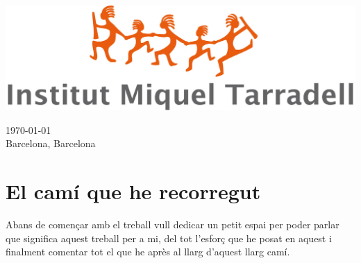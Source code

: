 \documentclass[a4paper,12pt,arial,numbered,print,index,oneside]{book}
\newcommand\blankpage{%
	\null
	\thispagestyle{empty}%
	\addtocounter{page}{-1}%
	\newpage}
\begin{document}
\begin{titlepage}
\begin{center}
\begin{singlespace}
		\vspace{1.5cm}
		\begin{minipage}{0.85\textwidth}
			\begin{center}
								\includegraphics[scale=0.2]{Figures/Cover/logo-tarradell.jpg}
			\end{center}
		\end{minipage}
		
		\vspace{.3cm}
		
		
		{\large \today} \\
		\large Barcelona, Barcelona  
		
		
		\vfill %
		\end{singlespace}
		\end{center}
		
	\end{titlepage}
	
	
	\afterpage{\blankpage}
	\begin{onehalfspacing}
		\tableofcontents
	\end{onehalfspacing}
	
	\clearpage
	
	\thispagestyle{plain}
	
	\section*{El camí que he recorregut}
	Abans de començar amb el treball vull dedicar un petit espai per poder parlar que significa aquest treball per a mi, del tot l'esforç que he posat en aquest i finalment comentar tot el que he après al llarg d'aquest llarg camí.
\end{document}
